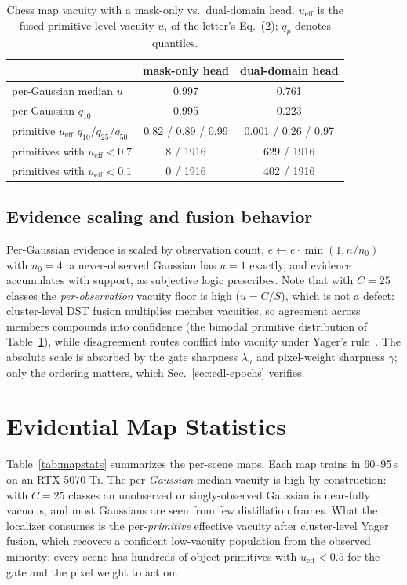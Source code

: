 \documentclass[journal]{IEEEtran}
\begin{document}
\begin{table}[t]
\caption{Chess map vacuity with a mask-only vs.\ dual-domain head.
$u_{\mathrm{eff}}$ is the fused primitive-level vacuity $u_i$ of the
letter's Eq.~(2); $q_p$ denotes quantiles.}
\label{tab:dual-domain}
\centering\footnotesize
\setlength{\tabcolsep}{3.5pt}
\begin{tabular}{@{}lcc@{}}
\toprule
 & mask-only head & dual-domain head \\
\midrule
per-Gaussian median $u$ & 0.997 & 0.761 \\
per-Gaussian $q_{10}$ & 0.995 & 0.223 \\
primitive $u_{\mathrm{eff}}$ $q_{10}/q_{25}/q_{50}$ & 0.82 / 0.89 / 0.99 & 0.001 / 0.26 / 0.97 \\
primitives with $u_{\mathrm{eff}}{<}0.7$ & 8 / 1916 & 629 / 1916 \\
primitives with $u_{\mathrm{eff}}{<}0.1$ & 0 / 1916 & 402 / 1916 \\
\bottomrule
\end{tabular}
\end{table}

\subsection{Evidence scaling and fusion behavior}
Per-Gaussian evidence is scaled by observation count,
$e \leftarrow e \cdot \min(1, n/n_0)$ with $n_0{=}4$: a never-observed
Gaussian has $u{=}1$ exactly, and evidence accumulates with support, as
subjective logic prescribes. Note that with $C{=}25$ classes the
\emph{per-observation} vacuity floor is high ($u = C/S$), which is not a
defect: cluster-level DST fusion multiplies member vacuities, so agreement
across members compounds into confidence (the bimodal primitive distribution
of Table~\ref{tab:dual-domain}), while disagreement routes conflict into
vacuity under Yager's rule~\cite{yager,dst}. The absolute scale is absorbed by the gate
sharpness $\lambda_u$ and pixel-weight sharpness $\gamma$; only the ordering
matters, which Sec.~\ref{sec:edl-epochs} verifies.

\section{Evidential Map Statistics}
\label{sec:mapstats}
Table~\ref{tab:mapstats} summarizes the per-scene maps. Each map trains in
60--95\,s on an RTX 5070 Ti. The per-\emph{Gaussian} median vacuity is high
by construction: with $C{=}25$ classes an unobserved or singly-observed
Gaussian is near-fully vacuous, and most Gaussians are seen from few
distillation frames. What the localizer consumes is the per-\emph{primitive}
effective vacuity after cluster-level Yager fusion, which recovers a
confident low-vacuity population from the observed minority: every scene has
hundreds of object primitives with $u_\text{eff}<0.5$ for the gate and the
pixel weight to act on.
\end{document}
